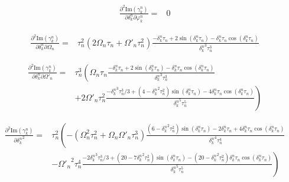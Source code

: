 \documentclass[10pt,fleqn]{article}
\newcommand{\eqar}[1]
{
  \begin{align*}
    #1
  \end{align*}
}
\newcommand{\paren}[1]{{\left({#1}\right)}}
\newcommand{\lparen}[1]{{\left({#1}\right.}}
\newcommand{\rparen}[1]{{\left.{#1}\right)}}
\begin{document}
\eqar{
  \frac{\partial^2\mathrm{Im}\paren{\gamma_k^n}}{\partial\delta_k^n\partial\varphi_k^n}=&0
}
\eqar{
  \frac{\partial^2\mathrm{Im}\paren{\gamma_k^n}}{\partial\delta_k^n\partial\Omega_n}=&\tau_n^2\paren{2\Omega_n\tau_n+\Omega'_n\tau_n^2}
  \frac{-\delta_k^n\tau_n+2\sin\paren{{\delta_k^n}\tau_n}-{\delta_k^n}\tau_n\cos\paren{{\delta_k^n}\tau_n}}{{\delta_k^n}^3\tau_n^3}
}
\eqar{
  \frac{\partial^2\mathrm{Im}\paren{\gamma_k^n}}{\partial\delta_k^n\partial\Omega'_n}=&\tau_n^3\lparen{
    \Omega_n\tau_n
    \frac{-\delta_k^n\tau_n+2\sin\paren{{\delta_k^n}\tau_n}-{\delta_k^n}\tau_n\cos\paren{{\delta_k^n}\tau_n}}{{\delta_k^n}^3\tau_n^3}
  }\\
  &\rparen{+2\Omega'_n\tau_n^2\frac{
      -{\delta_k^n}^3\tau_n^3/3
      +\paren{4-{\delta_k^n}^2\tau_n^2}\sin\paren{{\delta_k^n}\tau_n}
      -4{\delta_k^n}\tau_n\cos\paren{{\delta_k^n}\tau_n}
    }{{\delta_k^n}^5\tau_n^5}
  }
}
\eqar{
  \frac{\partial^2\mathrm{Im}\paren{\gamma_k^n}}{{\partial\delta_k^n}^2}=&\tau_n^2\lparen{
    -\paren{\Omega_n^2\tau_n^2+\Omega_n\Omega'_n\tau_n^3}
    \frac{
      \paren{6-{\delta_k^n}^2\tau_n^2}\sin\paren{{\delta_k^n}\tau_n}
      -2{\delta_k^n}\tau_n+4{\delta_k^n}\tau_n\cos\paren{{\delta_k^n}\tau_n}
    }{{\delta_k^n}^4\tau_n^4}
  }\\
  &\rparen{-{\Omega'_n}^2\tau_n^4
    \frac{
      -2{\delta_k^n}^3\tau_n^3/3
      +\paren{20-7{\delta_k^n}^2\tau_n^2}\sin\paren{{\delta_k^n}\tau_n}
      -\paren{20-{\delta_k^n}^2\tau_n^2}{\delta_k^n}\tau_n\cos\paren{{\delta_k^n}\tau_n}
    }{{\delta_k^n}^5\tau_n^5}
  }
}
\end{document}

